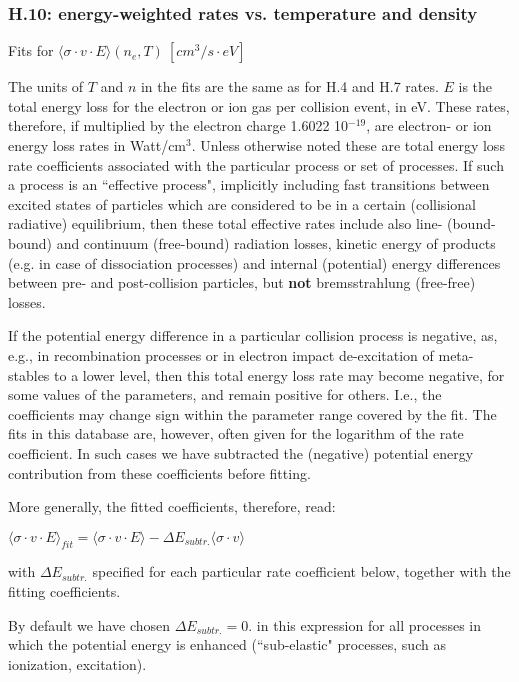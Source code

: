 \documentclass[12pt,dvipdfmx]{article}
\begin{document}
\subsubsection{H.10: energy-weighted rates vs. temperature and density}\label{sec1.3.10}
Fits for $\langle\sigma \cdot v \cdot E \rangle (n_e,T) \ [cm^3/s \cdot eV]$

The units of $T$ and $n$ in the fits are the same as for H.4 and H.7
rates. $E$ is the total energy loss for the electron or ion gas per
collision event, in eV. These rates, therefore, if multiplied by the
electron charge 1.6022 10$^{-19}$, are electron- or ion energy loss
rates in Watt/cm$^3$. Unless otherwise noted these are total energy
loss rate coefficients associated with the particular process or set of processes. If
such a process is an ``effective process", implicitly including fast
transitions between excited states of particles which are considered
to be in a certain (collisional radiative) equilibrium, then these
total effective rates include also line- (bound-bound) and continuum
(free-bound) radiation losses, kinetic energy of products (e.g. in
case of dissociation processes) and internal (potential) energy
differences between pre- and post-collision particles, but {\bf not}
bremsstrahlung (free-free) losses.

If the potential energy difference in a particular collision process
is negative, as, e.g., in recombination processes
or in electron impact de-excitation of meta-stables to a lower level,
then this total energy loss rate
may become negative, for some values of the parameters,
and remain positive for others.
I.e., the coefficients may change sign within the parameter
range covered by the fit.
The fits in this database are, however, often given for the logarithm of the
rate coefficient. In such cases we have subtracted the (negative) potential energy
contribution from these coefficients before fitting.

More generally, the fitted coefficients, therefore, read:

$\langle\sigma \cdot v \cdot E \rangle_{fit} = \langle\sigma \cdot v \cdot E \rangle - \Delta E_{subtr.} \langle\sigma \cdot v \rangle$

with $\Delta E_{subtr.} $ specified for each particular rate coefficient below, together
with the fitting coefficients.

By default we have chosen $\Delta E_{subtr.} = 0.$ in this expression
for all processes in which the potential energy is
enhanced (``sub-elastic" processes, such as ionization, excitation).
\end{document}
